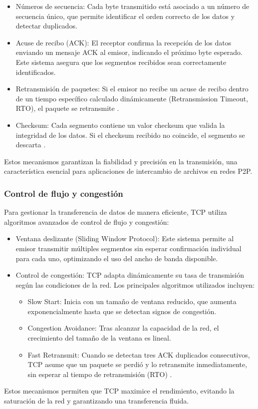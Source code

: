 \begin{itemize}
\item Números de secuencia: Cada byte transmitido está asociado a un número de secuencia único, que permite identificar el orden correcto de los datos y detectar duplicados.
\item Acuse de recibo (ACK): El receptor confirma la recepción de los datos enviando un mensaje ACK al emisor, indicando el próximo byte esperado. Este sistema asegura que los segmentos recibidos sean correctamente identificados.
\item Retransmisión de paquetes: Si el emisor no recibe un acuse de recibo dentro de un tiempo específico calculado dinámicamente (Retransmission Timeout, RTO), el paquete se retransmite \cite{jacobson1988congestion}.
\item Checksum: Cada segmento contiene un valor checksum que valida la integridad de los datos. Si el checksum recibido no coincide, el segmento se descarta \cite{kurose2016computer}.
\end{itemize}
Estos mecanismos garantizan la fiabilidad y precisión en la transmisión, una característica esencial para aplicaciones de intercambio de archivos en redes P2P.

\subsubsection*{Control de flujo y congestión}
Para gestionar la transferencia de datos de manera eficiente, TCP utiliza algoritmos avanzados de control de flujo y congestión:

\begin{itemize}
\item Ventana deslizante (Sliding Window Protocol): Este sistema permite al emisor transmitir múltiples segmentos sin esperar confirmación individual para cada uno, optimizando el uso del ancho de banda disponible.
\item Control de congestión: TCP adapta dinámicamente su tasa de transmisión según las condiciones de la red. Los principales algoritmos utilizados incluyen:\begin{itemize}
\item Slow Start: Inicia con un tamaño de ventana reducido, que aumenta exponencialmente hasta que se detectan signos de congestión.
\item Congestion Avoidance: Tras alcanzar la capacidad de la red, el crecimiento del tamaño de la ventana es lineal.
\item Fast Retransmit: Cuando se detectan tres ACK duplicados consecutivos, TCP asume que un paquete se perdió y lo retransmite inmediatamente, sin esperar al tiempo de retransmisión (RTO) \cite{jacobson1988congestion}.
\end{itemize}

\end{itemize}
Estos mecanismos permiten que TCP maximice el rendimiento, evitando la saturación de la red y garantizando una transferencia fluida.

